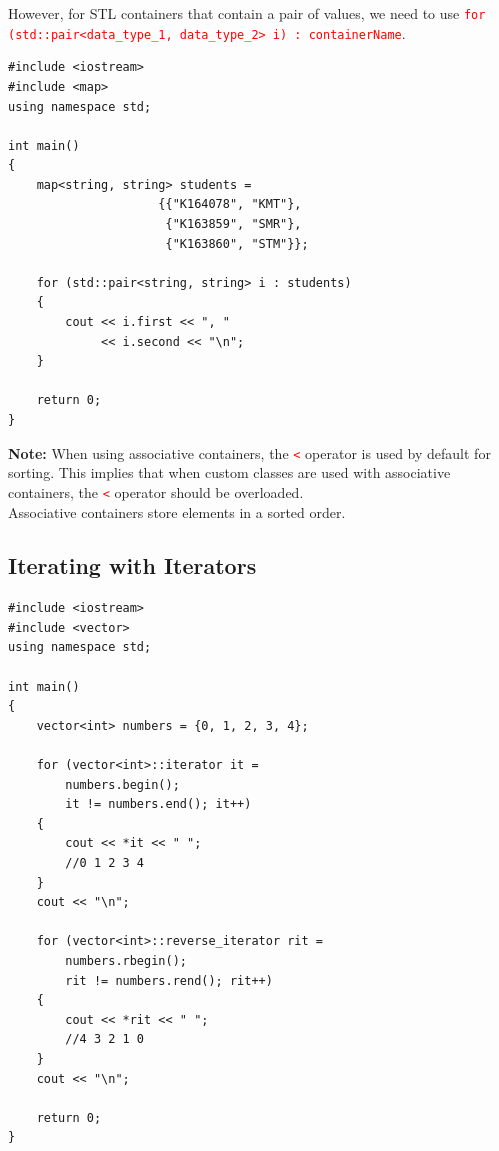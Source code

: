\documentclass[12pt]{article}
\begin{document}
\noindent However, for STL containers that contain a pair of values, we need to use \textcolor{red}{\texttt{for (std::pair<data\_type\_1, data\_type\_2> i) : containerName}}. 

\begin{verbatim}
#include <iostream>
#include <map>
using namespace std;

int main()
{	
    map<string, string> students =
                     {{"K164078", "KMT"}, 
                      {"K163859", "SMR"}, 
                      {"K163860", "STM"}};

    for (std::pair<string, string> i : students)
    {
        cout << i.first << ", " 
             << i.second << "\n";
    }

    return 0;
}
\end{verbatim}

\vspace{1cm}

\noindent \textbf{Note:} When using associative containers, the \textcolor{red}{\texttt{<}} operator is used by default for sorting. This implies that when custom classes are used with 
associative containers, the \textcolor{red}{\texttt{<}} operator should be overloaded. \\

\noindent Associative containers store elements in a sorted order. \\





\newpage
{}
\subsection*{Iterating with Iterators}

\begin{verbatim}
#include <iostream>
#include <vector>
using namespace std;

int main()
{
    vector<int> numbers = {0, 1, 2, 3, 4};

    for (vector<int>::iterator it = 
        numbers.begin(); 
        it != numbers.end(); it++)
    {
        cout << *it << " ";
        //0 1 2 3 4
    }
    cout << "\n";

    for (vector<int>::reverse_iterator rit = 
        numbers.rbegin(); 
        rit != numbers.rend(); rit++)
    {
        cout << *rit << " ";
        //4 3 2 1 0
    }
    cout << "\n";	

    return 0;
}
\end{verbatim}
\end{document}
